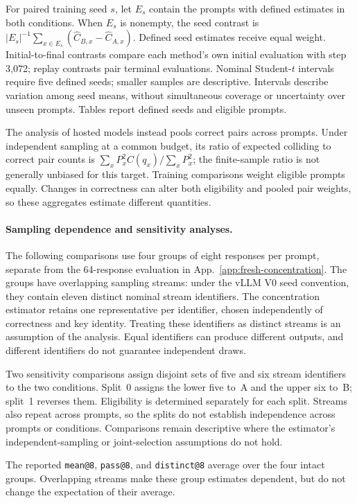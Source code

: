 For paired training seed $s$, let $E_s$ contain the prompts with defined
estimates in both conditions. When $E_s$ is nonempty, the seed contrast is
$|E_s|^{-1}\sum_{x\in E_s}(\widehat C_{B,x}-\widehat C_{A,x})$.
Defined seed estimates receive equal weight. Initial-to-final contrasts
compare each method's own initial evaluation with step 3,072; replay
contrasts pair terminal evaluations. Nominal Student-$t$ intervals require
five defined seeds; smaller samples are descriptive. Intervals describe
variation among seed means, without simultaneous coverage or uncertainty
over unseen prompts. Tables report defined seeds and eligible prompts.

The analysis of hosted models instead pools correct pairs across prompts. Under
independent sampling at a common budget, its ratio of expected colliding
to correct pair counts is
$\sum_x P_x^2 C(q_x)/\sum_x P_x^2$; the finite-sample ratio is not generally
unbiased for this target. Training comparisons weight eligible prompts
equally. Changes in correctness can alter both eligibility and pooled pair
weights, so these aggregates estimate different quantities.

\paragraph{Sampling dependence and sensitivity analyses.}
The following comparisons use four groups of eight responses per prompt,
separate from the 64-response evaluation in App.~\ref{app:fresh-concentration}.
The groups have overlapping sampling streams: under the vLLM V0 seed
convention, they contain eleven distinct nominal stream identifiers.
The concentration estimator retains one representative per identifier,
chosen independently of correctness and key identity. Treating these
identifiers as distinct streams is an assumption of the analysis. Equal
identifiers can produce different outputs, and different identifiers do
not guarantee independent draws.

Two sensitivity comparisons assign disjoint sets of five and six stream
identifiers to the two conditions. Split~0 assigns the lower five to~A and
the upper six to~B; split~1 reverses them. Eligibility is determined
separately for each split. Streams also repeat across prompts, so the
splits do not establish independence across prompts or conditions.
Comparisons remain descriptive where the estimator's independent-sampling
or joint-selection assumptions do not hold.

The reported \texttt{mean@8}, \texttt{pass@8}, and \texttt{distinct@8}
average over the four intact groups. Overlapping streams make these group
estimates dependent, but do not change the expectation of their average.

